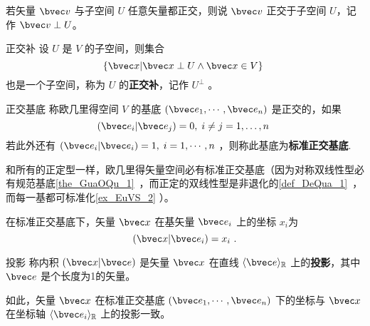 若矢量 $\bvec v$ 与子空间 $U$ 任意矢量都正交，则说 $\bvec v$ 正交于子空间 $U$，记作 $\bvec v\perp U$。
\begin{definition}{正交补}
设 $U$ 是 $V$ 的子空间，则集合
\begin{equation}
\{\bvec x|\bvec x\perp U\wedge\bvec x\in V\}~
\end{equation}
也是一个子空间，称为 $U$ 的\textbf{正交补}，记作 $U^{\perp}$ 。
\end{definition}
\begin{definition}{正交基底}
称欧几里得空间 $V$ 的基底 $(\bvec e_1,\cdots,\bvec e_n)$ 是正交的，如果
\begin{equation}
(\bvec e_i|\bvec e_j)=0,\;i\neq j=1,\dots,n~
\end{equation}
若此外还有 $(\bvec e_i|\bvec e_i)=1,\;i=1,\cdots ,n$ ，则称此基底为\textbf{标准正交基底}.
\end{definition}

和所有的正定型一样，欧几里得矢量空间必有标准正交基底（因为对称双线性型必有规范基底\autoref{the_GuaOQu_1}~，而正定的双线性型是非退化的\autoref{def_DeQua_1}~，而每一基都可标准化\autoref{ex_EuVS_2} ）。
\begin{exercise}{}
在标准正交基底下，矢量 $\bvec x$ 在基矢量 $\bvec e_i$ 上的坐标 $x_i$为
\begin{equation}
(\bvec x|\bvec e_i)=x_i~.
\end{equation}
\end{exercise}
\begin{definition}{投影}
称内积 $(\bvec x|\bvec e)$ 是矢量 $\bvec x$ 在直线 $\langle\bvec e\rangle_{\mathbb R}$ 上的\textbf{投影}，其中 $\bvec e$ 是个长度为1的矢量。  
\end{definition}
如此，矢量 $\bvec x$ 在标准正交基底 $(\bvec e_1,\cdots,\bvec e_n)$ 下的坐标与 $\bvec x$ 在坐标轴 $\langle\bvec e_i\rangle_\mathbb{R}$ 上的投影一致。 